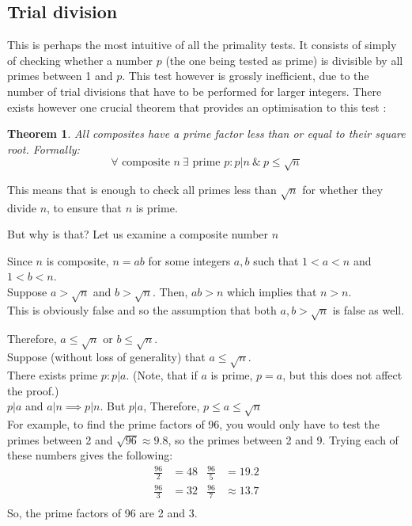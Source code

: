 \documentclass[12pt, titlepage]{article}
\newtheorem{theorem}{Theorem}
\begin{document}
    \subsection{Trial division}

    This is perhaps the most intuitive of all the primality tests. It consists of simply of
    checking whether a number $p$ (the one being tested as prime) is divisible by all primes
    between 1 and $p$. This test however is grossly inefficient, due to the number of trial
    divisions that have to be performed for larger integers. There exists however one
    crucial theorem that provides an optimisation to this test
    \autocite[276]{haese_ib_options}:
    \begin{theorem} \label{th:prime_factors_less_than_root}
        All composites have a prime factor less than or equal to their square
        root. Formally:\\
        $$\forall \text{ composite } n \: \exists \text{ prime } p:p|n \: \& \: p \leq \sqrt{n}$$
    \end{theorem}
    This means that is enough to check all primes less than $\sqrt{n}$ for whether they
    divide $n$, to ensure that $n$ is prime. 
    
    But why is that? Let us examine a composite number $n$

    Since $n$ is composite, $n=ab$ for some integers $a, b$ such that $1<a<n$ and $1<b<n$.\\
    Suppose $a>\sqrt{n}$ and $b>\sqrt{n}$. Then, $ab>n$ which implies that $n>n$. \\
    This is obviously false and so the assumption that both $a,b > \sqrt{n}$ is false as
    well.

    Therefore, $a \leq \sqrt{n}$ or $b \leq \sqrt{n}$. \\
    Suppose (without loss of generality) that $a \leq \sqrt{n}$.\\
    There exists prime $p: p|a$. (Note, that if $a$ is prime, $p = a$, but this does not
    affect the proof.)\\
    $p|a$ and $a|n \implies p|n$. But $p|a$, Therefore,  $p \leq a \leq \sqrt{n}$\\

    For example, to find the prime factors of 96, you would only have to test the primes
    between 2 and $\sqrt{96} \approx 9.8$, so the primes between 2 and 9. Trying
    each of these numbers gives the following:
    \begin{align*}
        \frac{96}{2} &= 48 &\frac{96}{5} &= 19.2 \\
        \frac{96}{3} &= 32 &\frac{96}{7} &\approx 13.7\\
    \end{align*}
    So, the prime factors of 96 are 2 and 3.
\end{document}
